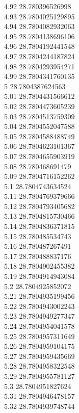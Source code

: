 {4.92	28.780396526998\\
4.93	28.7804025129895\\
4.94	28.7804082932063\\
4.95	28.7804138696106\\
4.96	28.7804192441548\\
4.97	28.7804244187824\\
4.98	28.7804293954271\\
4.99	28.7804341760135\\
5	28.7804387624563\\
5.01	28.7804431566612\\
5.02	28.7804473605239\\
5.03	28.7804513759309\\
5.04	28.7804552047588\\
5.05	28.7804588488749\\
5.06	28.7804623101367\\
5.07	28.7804655903919\\
5.08	28.780468691479\\
5.09	28.7804716152262\\
5.1	28.7804743634524\\
5.11	28.7804769379666\\
5.12	28.7804793405682\\
5.13	28.7804815730466\\
5.14	28.7804836371815\\
5.15	28.780485534743\\
5.16	28.780487267491\\
5.17	28.780488837176\\
5.18	28.7804902455382\\
5.19	28.7804914943084\\
5.2	28.7804925852072\\
5.21	28.7804935199456\\
5.22	28.7804943002243\\
5.23	28.7804949277347\\
5.24	28.7804954041578\\
5.25	28.7804957311649\\
5.26	28.7804959104175\\
5.27	28.7804959435669\\
5.28	28.7804958322548\\
5.29	28.7804955781127\\
5.3	28.7804951827624\\
5.31	28.7804946478157\\
5.32	28.7804939748744\\
}
